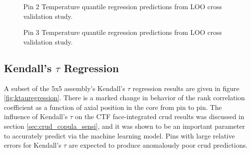 \begin{figure}[H]%
    \centering
    \qquad
    \caption[Q-Q LOO Temperature pin 2 results.]{Pin 2 Temperature quantile regression predictions from LOO cross validation study.}%
    \label{fig:temppin2}%
\end{figure}

\begin{figure}[H]%
    \centering
    \qquad
    \caption[Q-Q LOO Temperature pin 3 results.]{Pin 3 Temperature quantile regression predictions from LOO cross validation study.}%
    \label{fig:temppin3}%
\end{figure}

\subsection{Kendall's $\tau$ Regression}

A subset of the 5x5 assembly's Kendall's $\tau$ regression results are given in figure \ref{fig:ktauregression}.  There is a marked change in behavior of the rank correlation coefficient as a function of axial position in the core from pin to pin.  The influence of Kendall's $\tau$ on the CTF face-integrated crud results was discussed in section \ref{sec:crud_copula_sensi}, and it was shown to be an important parameter to accurately predict via the machine learning model.  Pins with large relative errors for Kendall's $\tau$ are expected to produce anomalously poor crud predictions.

